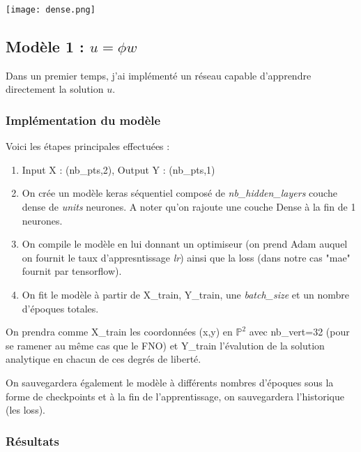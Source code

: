 \begin{minipage}{\linewidth}
	\centering
	\texttt{[image: dense.png]}
\end{minipage}

\newpage

\subsection{Modèle 1 : $u=\phi w$}

Dans un premier temps, j'ai implémenté un réseau capable d'apprendre directement la solution $u$. 

\subsubsection{Implémentation du modèle}

Voici les étapes principales effectuées :
\begin{enumerate}[label=\textbullet]
	\item Input X : (nb\_pts,2), Output Y : (nb\_pts,1)  
	\item On crée un modèle keras séquentiel composé de \textit{nb\_hidden\_layers} couche dense de \textit{units} neurones. A noter qu'on rajoute une couche Dense à la fin de 1 neurones.
	\item On compile le modèle en lui donnant un optimiseur (on prend Adam auquel on fournit le taux d'appresntissage \textit{lr}) ainsi que la loss (dans notre cas "mae" fournit par tensorflow).
	\item On fit le modèle à partir de X\_train, Y\_train, une \textit{batch\_size} et un nombre d'époques totales.
\end{enumerate}

\begin{Rem}
	On prendra comme X\_train les coordonnées (x,y) en $\mathbb{P}^2$ avec nb\_vert=32 (pour se ramener au même cas que le FNO) et Y\_train l'évalution de la solution analytique en chacun de ces degrés de liberté.
	
	On sauvegardera également le modèle à différents nombres d'époques sous la forme de checkpoints et à la fin de l'apprentissage, on sauvegardera l'historique (les loss).
\end{Rem}

\subsubsection{Résultats}


